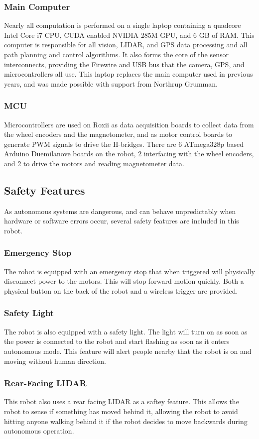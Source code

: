 \subsubsection{Main Computer}

Nearly all computation is performed on a single laptop containing a quadcore Intel Core i7 CPU, CUDA enabled NVIDIA 285M GPU, and 6 GB of RAM. This computer is responsible for all vision, LIDAR, and GPS data processing and all path planning and control algorithms. It also forms the core of the sensor interconnects, providing the Firewire and USB bus that the camera, GPS, and microcontrollers all use. This laptop replaces the main computer used in previous years, and was made possible with support from Northrup Grumman.

\subsubsection{MCU}

Microcontrollers are used on Roxii as data acquisition boards to collect data from the wheel encoders and the magnetometer, and as motor control boards to generate PWM signals to drive the H-bridges. There are 6 ATmega328p based Arduino Duemilanove boards on the robot, 2 interfacing with the wheel encoders, and 2 to drive the motors and reading magnetometer data.

\subsection{Safety Features}

As autonomous systems are dangerous, and can behave unpredictably when hardware or software errors occur, several safety features are included in this robot.

\subsubsection{Emergency Stop}

The robot is equipped with an emergency stop that when triggered will physically disconnect power to the motors. This will stop forward motion quickly. Both a physical button on the back of the robot and a wireless trigger are provided.

\subsubsection{Safety Light}
The robot is also equipped with a safety light. The light will turn on as soon as the power is connected to the robot and start flashing as soon as it enters autonomous mode. This feature will alert people nearby that the robot is on and moving without human direction.

\subsubsection{Rear-Facing LIDAR}

This robot also uses a rear facing LIDAR as a saftey feature. This allows the robot to sense if something has moved behind it, allowing the robot to avoid hitting anyone walking behind it if the robot decides to move backwards during autonomous operation.
